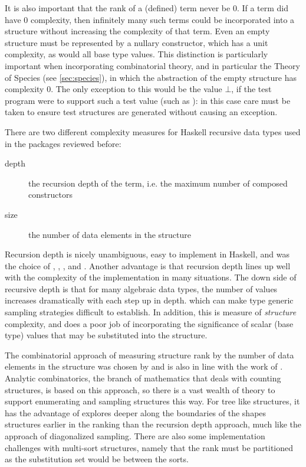 It is also important that the rank of a (defined) term never be $0$.
If a term did have $0$ complexity,
then infinitely many such terms could be incorporated into a structure
without increasing the complexity of that term.
Even an empty structure must be represented by a nullary constructor,
which has a unit complexity, as would all base type values.
This distinction is particularly important when incorporating combinatorial theory, 
and in particular the Theory of Species (see \ref{sec:species}),
in which the abstraction of the empty structure has complexity $0$.
The only exception to this would be the value $\bot$,
if the test program were to support such a test value (such as \LSC):
in this case care must be taken to ensure test structures are generated without causing an exception.


There are two different complexity measures for Haskell recursive data types
used in the packages reviewed before:

\begin{description}
\item[depth] the recursion depth of the term, i.e. the maximum number of composed constructors
\item[size] the number of data elements in the structure
\end{description}

Recursion depth is nicely unambiguous, easy to implement in Haskell,
and was the choice of \QC, \SC, \EC, \GAST and \DAISTS.
Another advantage is that recursion depth lines up well 
with the complexity of the implementation in many situations.
The down side of recursive depth is that 
for many algebraic data types, 
the number of values increases dramatically with each step up in depth.
which can make type generic sampling strategies difficult to establish.
In addition, this is measure of \emph{structure} complexity, 
and does a poor job of incorporating the significance of 
scalar (base type) values that may be substituted into the structure.

The combinatorial approach of measuring structure rank by the number of data elements in the structure
was chosen by \FEAT and is also in line with the work of .
Analytic combinatorics, the branch of mathematics that deals with counting structures,
is based on this approach, so there is a vast wealth of theory to support enumerating and sampling
structures this way.
For tree like structures, it has the advantage of explores deeper along the boundaries
of the shapes structures earlier in the ranking than the recursion depth approach,
much like the \EC approach of diagonalized sampling.
There are also some implementation challenges with multi-sort structures,
namely that the rank must be partitioned as the substitution set would be between the sorts.

